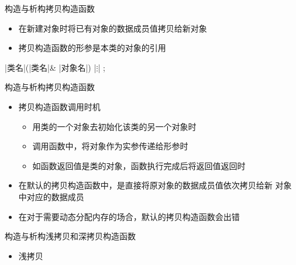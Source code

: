 \begin{frame}[t, fragile]{构造与析构}{拷贝构造函数}%
  \begin{spacing}{1.8}
    \begin{itemize}
    \item 在新建对象时将已有对象的数据成员值拷贝给新对象
    \item 拷贝构造函数的形参是\alert{本类的对象的引用}
    \end{itemize}
  \end{spacing}
  \begin{center}
    \begin{minipage}{0.3\linewidth}
      \begin{cpptt}
|类名|(|类名|& |对象名|)
{
  |$\vdots$|
};
     \end{cpptt}
    \end{minipage}\qquad\qquad
    \begin{minipage}{0.5\linewidth}
    \end{minipage}
  \end{center}
\end{frame}

\begin{frame}[t,fragile]{构造与析构}{拷贝构造函数}%
  \stretchon
  \begin{itemize}
  \item 拷贝构造函数调用时机
    \begin{itemize}
    \item 用类的一个对象去初始化该类的另一个对象时
    \item 调用函数中，将对象作为实参传递给形参时
    \item 如函数返回值是类的对象，函数执行完成后将返回值返回时
    \end{itemize}
  \item 在默认的拷贝构造函数中，是直接将原对象的数据成员值依次拷贝给新
    对象中对应的数据成员
  \item 在对于需要动态分配内存的场合，默认的拷贝构造函数会出错
  \end{itemize}
  \stretchoff
\end{frame}

\begin{frame}[t, fragile]{构造与析构}{浅拷贝和深拷贝构造函数}%
  \begin{itemize}
  \item 浅拷贝
  \end{itemize}
  \begin{center}
    \begin{minipage}{0.45\linewidth}
    \end{minipage}\qquad\quad
    \begin{minipage}{0.4\linewidth}
    \end{minipage}
  \end{center}
\end{frame}

